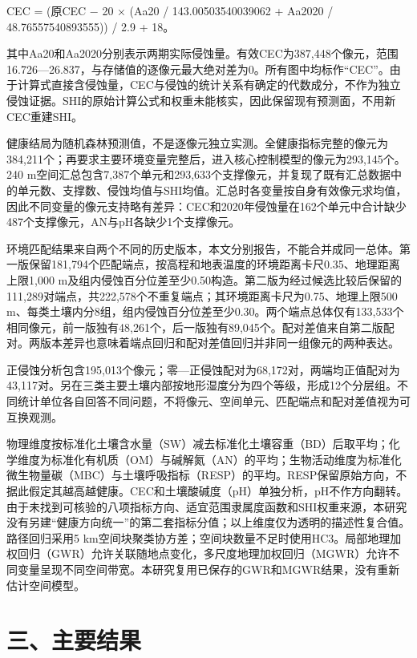 \documentclass[
  a4paper,
  12pt]{ctexart}
\begin{document}
CEC = (原CEC − 20 × (Aa20 / 143.00503540039062 + Aa2020 /
48.76557540893555)) / 2.9 + 18。

其中Aa20和Aa2020分别表示两期实际侵蚀量。有效CEC为387,448个像元，范围16.726---26.837，与存储值的逐像元最大绝对差为0。所有图中均标作``CEC''。由于计算式直接含侵蚀量，CEC与侵蚀的统计关系有确定的代数成分，不作为独立侵蚀证据。SHI的原始计算公式和权重未能核实，因此保留现有预测面，不用新CEC重建SHI。

健康结局为随机森林预测值，不是逐像元独立实测。全健康指标完整的像元为384,211个；再要求主要环境变量完整后，进入核心控制模型的像元为293,145个。240
m空间汇总包含7,387个单元和293,633个支撑像元，并复现了既有汇总数据中的单元数、支撑数、侵蚀均值与SHI均值。汇总时各变量按自身有效像元求均值，因此不同变量的像元支持略有差异：CEC和2020年侵蚀量在162个单元中合计缺少487个支撑像元，AN与pH各缺少1个支撑像元。

环境匹配结果来自两个不同的历史版本，本文分别报告，不能合并成同一总体。第一版保留181,794个匹配端点，按高程和地表温度的环境距离卡尺0.35、地理距离上限1,000
m及组内侵蚀百分位差至少0.50构造。第二版为经过候选比较后保留的111,289对端点，共222,578个不重复端点；其环境距离卡尺为0.75、地理上限500
m、每类土壤内分8组，组内侵蚀百分位差至少0.30。两个端点总体仅有133,533个相同像元，前一版独有48,261个，后一版独有89,045个。配对差值来自第二版配对。两版本差异也意味着端点回归和配对差值回归并非同一组像元的两种表达。

正侵蚀分析包含195,013个像元；零---正侵蚀配对为68,172对，两端均正值配对为43,117对。另在三类主要土壤内部按地形湿度分为四个等级，形成12个分层组。不同统计单位各自回答不同问题，不将像元、空间单元、匹配端点和配对差值视为可互换观测。

物理维度按标准化土壤含水量（SW）减去标准化土壤容重（BD）后取平均；化学维度为标准化有机质（OM）与碱解氮（AN）的平均；生物活动维度为标准化微生物量碳（MBC）与土壤呼吸指标（RESP）的平均。RESP保留原始方向，不据此假定其越高越健康。CEC和土壤酸碱度（pH）单独分析，pH不作方向翻转。由于未找到可核验的八项指标方向、适宜范围隶属度函数和SHI权重来源，本研究没有另建``健康方向统一''的第二套指标分值；以上维度仅为透明的描述性复合值。路径回归采用5
km空间块聚类协方差；空间块数量不足时使用HC3。局部地理加权回归（GWR）允许关联随地点变化，多尺度地理加权回归（MGWR）允许不同变量呈现不同空间带宽。本研究复用已保存的GWR和MGWR结果，没有重新估计空间模型。

\hypertarget{ux4e09ux4e3bux8981ux7ed3ux679c}{%
\section{三、主要结果}\label{ux4e09ux4e3bux8981ux7ed3ux679c}}
\end{document}
